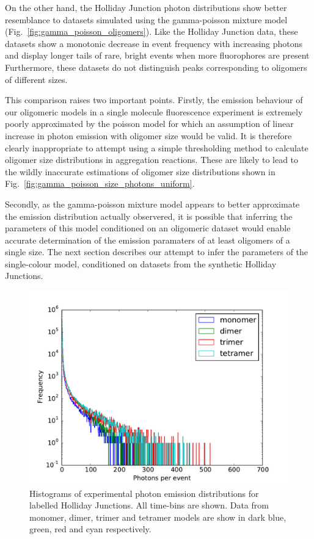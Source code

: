 On the other hand, the Holliday Junction photon distributions show better resemblance to datasets simulated using the gamma-poisson mixture model (Fig.~\ref{fig:gamma_poisson_oligomers}). Like the Holliday Junction data, these datasets show a monotonic decrease in event frequency with increasing photons and display longer tails of rare, bright events when more fluorophores are present Furthermore, these datasets do not distinguish peaks corresponding to oligomers of different sizes. 

This comparison raises two important points. Firstly, the emission behaviour of our oligomeric models in a single molecule fluorescence experiment is extremely poorly approximated by the poisson model for which an assumption of linear increase in photon emission with oligomer size would be valid. It is therefore clearly inappropriate to attempt using a simple thresholding method to calculate oligomer size distributions in aggregation reactions. These are likely to lead to the wildly inaccurate estimations of oligomer size distributions shown in Fig.~\ref{fig:gamma_poisson_size_photons_uniform}.

Secondly, as the gamma-poisson mixture model appears to better approximate the emission distribution actually observered, it is possible that inferring the parameters of this model conditioned on an oligomeric dataset would enable accurate determination of the emission paramaters of at least oligomers of a single size. The next section describes our attempt to infer the parameters of the single-colour model, conditioned on datasets from the synthetic Holliday Junctions.  

\begin{figure}
   \begin{center}
      \includegraphics*[clip=true, width=6in]{sizing/Holliday_Junctions.pdf}
      \caption{Histograms of experimental photon emission distributions for labelled Holliday Junctions. All time-bins are shown. Data from monomer, dimer, trimer and tetramer models are show in dark blue, green, red and cyan respectively.}
      \label{fig:HJ_oligomers}
   \end{center}
\end{figure}

